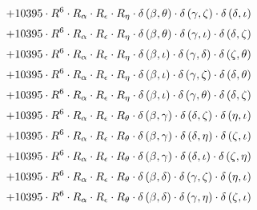 \begin{subequations}
\begin{gather}
 \\[0.2em] \notag 		 + 10395 \cdot R^{6} \cdot R_{\alpha{}} \cdot R_{\epsilon{}} \cdot R_{\eta{}} \cdot \delta{}\left(\beta{}, \theta{}\right) \cdot \delta{}\left(\gamma{}, \zeta{}\right) \cdot \delta{}\left(\delta{}, \iota{}\right) 
 \\[0.2em] \notag 		 + 10395 \cdot R^{6} \cdot R_{\alpha{}} \cdot R_{\epsilon{}} \cdot R_{\eta{}} \cdot \delta{}\left(\beta{}, \theta{}\right) \cdot \delta{}\left(\gamma{}, \iota{}\right) \cdot \delta{}\left(\delta{}, \zeta{}\right) 
 \\[0.2em] \notag 		 + 10395 \cdot R^{6} \cdot R_{\alpha{}} \cdot R_{\epsilon{}} \cdot R_{\eta{}} \cdot \delta{}\left(\beta{}, \iota{}\right) \cdot \delta{}\left(\gamma{}, \delta{}\right) \cdot \delta{}\left(\zeta{}, \theta{}\right) 
 \\[0.2em] \notag 		 + 10395 \cdot R^{6} \cdot R_{\alpha{}} \cdot R_{\epsilon{}} \cdot R_{\eta{}} \cdot \delta{}\left(\beta{}, \iota{}\right) \cdot \delta{}\left(\gamma{}, \zeta{}\right) \cdot \delta{}\left(\delta{}, \theta{}\right) 
 \\[0.2em] \notag 		 + 10395 \cdot R^{6} \cdot R_{\alpha{}} \cdot R_{\epsilon{}} \cdot R_{\eta{}} \cdot \delta{}\left(\beta{}, \iota{}\right) \cdot \delta{}\left(\gamma{}, \theta{}\right) \cdot \delta{}\left(\delta{}, \zeta{}\right) 
 \\[0.2em] \notag 		 + 10395 \cdot R^{6} \cdot R_{\alpha{}} \cdot R_{\epsilon{}} \cdot R_{\theta{}} \cdot \delta{}\left(\beta{}, \gamma{}\right) \cdot \delta{}\left(\delta{}, \zeta{}\right) \cdot \delta{}\left(\eta{}, \iota{}\right) 
 \\[0.2em] \notag 		 + 10395 \cdot R^{6} \cdot R_{\alpha{}} \cdot R_{\epsilon{}} \cdot R_{\theta{}} \cdot \delta{}\left(\beta{}, \gamma{}\right) \cdot \delta{}\left(\delta{}, \eta{}\right) \cdot \delta{}\left(\zeta{}, \iota{}\right) 
 \\[0.2em] \notag 		 + 10395 \cdot R^{6} \cdot R_{\alpha{}} \cdot R_{\epsilon{}} \cdot R_{\theta{}} \cdot \delta{}\left(\beta{}, \gamma{}\right) \cdot \delta{}\left(\delta{}, \iota{}\right) \cdot \delta{}\left(\zeta{}, \eta{}\right) 
 \\[0.2em] \notag 		 + 10395 \cdot R^{6} \cdot R_{\alpha{}} \cdot R_{\epsilon{}} \cdot R_{\theta{}} \cdot \delta{}\left(\beta{}, \delta{}\right) \cdot \delta{}\left(\gamma{}, \zeta{}\right) \cdot \delta{}\left(\eta{}, \iota{}\right) 
 \\[0.2em] \notag 		 + 10395 \cdot R^{6} \cdot R_{\alpha{}} \cdot R_{\epsilon{}} \cdot R_{\theta{}} \cdot \delta{}\left(\beta{}, \delta{}\right) \cdot \delta{}\left(\gamma{}, \eta{}\right) \cdot \delta{}\left(\zeta{}, \iota{}\right) 

\end{gather}
\end{subequations}
